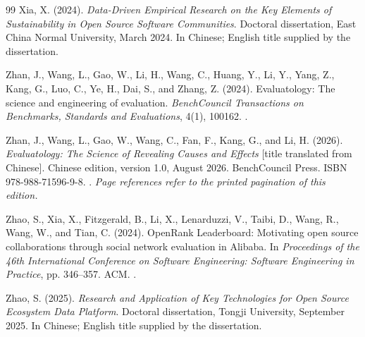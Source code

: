 \begin{thebibliography}{99}
Xia, X. (2024).
\emph{Data-Driven Empirical Research on the Key Elements of Sustainability in Open Source Software Communities}.
Doctoral dissertation, East China Normal University, March 2024. In Chinese; English title supplied by the dissertation.

Zhan, J., Wang, L., Gao, W., Li, H., Wang, C., Huang, Y., Li, Y., Yang, Z., Kang, G., Luo, C., Ye, H., Dai, S., and Zhang, Z. (2024).
Evaluatology: The science and engineering of evaluation.
\emph{BenchCouncil Transactions on Benchmarks, Standards and Evaluations}, 4(1), 100162.
.

Zhan, J., Wang, L., Gao, W., Wang, C., Fan, F., Kang, G., and Li, H. (2026).
\emph{Evaluatology: The Science of Revealing Causes and Effects} [title translated from Chinese].
Chinese edition, version 1.0, August 2026. BenchCouncil Press.
ISBN 978-988-71596-9-8. .
\emph{Page references refer to the printed pagination of this edition.}

Zhao, S., Xia, X., Fitzgerald, B., Li, X., Lenarduzzi, V., Taibi, D., Wang, R., Wang, W., and Tian, C. (2024).
OpenRank Leaderboard: Motivating open source collaborations through social network evaluation in Alibaba.
In \emph{Proceedings of the 46th International Conference on Software Engineering: Software Engineering in Practice}, pp. 346--357. ACM.
.

Zhao, S. (2025).
\emph{Research and Application of Key Technologies for Open Source Ecosystem Data Platform}.
Doctoral dissertation, Tongji University, September 2025. In Chinese; English title supplied by the dissertation.
\end{thebibliography}
\endgroup
